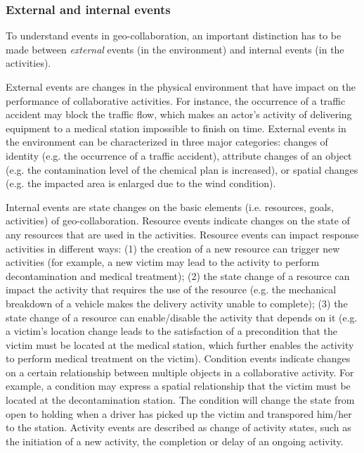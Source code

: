 \subsubsection{External and internal events} %
\label{ssub:external_and_internal_events}
To understand events in geo-collaboration, an important distinction has to be made between \emph{external} events (in the environment) and internal events (in the activities). 

External events are changes in the physical environment that have impact on the performance of collaborative activities. For instance, the occurrence of a traffic accident may block the traffic flow, which makes an actor’s activity of delivering equipment to a medical station impossible to finish on time. External events in the environment can be characterized in three major categories: changes of identity (e.g. the occurrence of a traffic accident), attribute changes of an object (e.g. the contamination level of the chemical plan is increased), or spatial changes (e.g. the impacted area is enlarged due to the wind condition).

Internal events are state changes on the basic elements (i.e. resources, goals, activities) of geo-collaboration. Resource events indicate changes on the state of any resources that are used in the activities. Resource events can impact response activities in different ways: (1) the creation of a new resource can trigger new activities (for example, a new victim may lead to the activity to perform decontamination and medical treatment); (2) the state change of a resource can impact the activity that requires the use of the resource (e.g. the mechanical breakdown of a vehicle makes the delivery activity unable to complete); (3) the state change of a resource can enable/disable the activity that depends on it (e.g. a victim’s location change leads to the satisfaction of a precondition that the victim must be located at the medical station, which further enables the activity to perform medical treatment on the victim). Condition events indicate changes on a certain relationship between multiple objects in a collaborative activity. For example, a condition may express a spatial relationship that the victim must be located at the decontamination station. The condition will change the state from open to holding when a driver has picked up the victim and transpored him/her to the station. Activity events are described as change of activity states, such as the initiation of a new activity, the completion or delay of an ongoing activity. 

